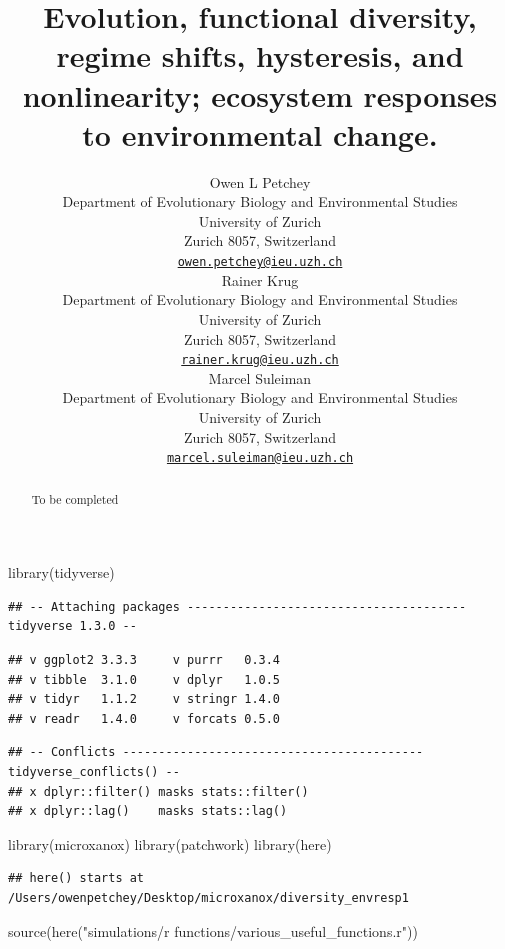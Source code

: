 \documentclass{article}
\title{Evolution, functional diversity, regime shifts, hysteresis, and
nonlinearity; ecosystem responses to environmental change.}
\author{
    Owen L Petchey
   \\
    Department of Evolutionary Biology and Environmental Studies \\
    University of Zurich \\
  Zurich 8057, Switzerland \\
  \texttt{\href{mailto:owen.petchey@ieu.uzh.ch}{\nolinkurl{owen.petchey@ieu.uzh.ch}}} \\
   \And
    Rainer Krug
   \\
    Department of Evolutionary Biology and Environmental Studies \\
    University of Zurich \\
  Zurich 8057, Switzerland \\
  \texttt{\href{mailto:rainer.krug@ieu.uzh.ch}{\nolinkurl{rainer.krug@ieu.uzh.ch}}} \\
   \And
    Marcel Suleiman
   \\
    Department of Evolutionary Biology and Environmental Studies \\
    University of Zurich \\
  Zurich 8057, Switzerland \\
  \texttt{\href{mailto:marcel.suleiman@ieu.uzh.ch}{\nolinkurl{marcel.suleiman@ieu.uzh.ch}}} \\
  }
\newenvironment{Shaded}{\begin{snugshade}}{\end{snugshade}}
\newcommand{\FunctionTok}[1]{\textcolor[rgb]{0.00,0.00,0.00}{#1}}
\newcommand{\NormalTok}[1]{#1}
\newcommand{\StringTok}[1]{\textcolor[rgb]{0.31,0.60,0.02}{#1}}
\begin{document}
\maketitle

\def\tightlist{}


\begin{abstract}
To be completed
\end{abstract}


\begin{Shaded}
\begin{Highlighting}[]
\FunctionTok{library}\NormalTok{(tidyverse)}
\end{Highlighting}
\end{Shaded}

\begin{verbatim}
## -- Attaching packages --------------------------------------- tidyverse 1.3.0 --
\end{verbatim}

\begin{verbatim}
## v ggplot2 3.3.3     v purrr   0.3.4
## v tibble  3.1.0     v dplyr   1.0.5
## v tidyr   1.1.2     v stringr 1.4.0
## v readr   1.4.0     v forcats 0.5.0
\end{verbatim}

\begin{verbatim}
## -- Conflicts ------------------------------------------ tidyverse_conflicts() --
## x dplyr::filter() masks stats::filter()
## x dplyr::lag()    masks stats::lag()
\end{verbatim}

\begin{Shaded}
\begin{Highlighting}[]
\FunctionTok{library}\NormalTok{(microxanox)}
\FunctionTok{library}\NormalTok{(patchwork)}
\FunctionTok{library}\NormalTok{(here)}
\end{Highlighting}
\end{Shaded}

\begin{verbatim}
## here() starts at /Users/owenpetchey/Desktop/microxanox/diversity_envresp1
\end{verbatim}

\begin{Shaded}
\begin{Highlighting}[]
\FunctionTok{source}\NormalTok{(}\FunctionTok{here}\NormalTok{(}\StringTok{"simulations/r functions/various\_useful\_functions.r"}\NormalTok{))}
\end{Highlighting}
\end{Shaded}
\end{document}
